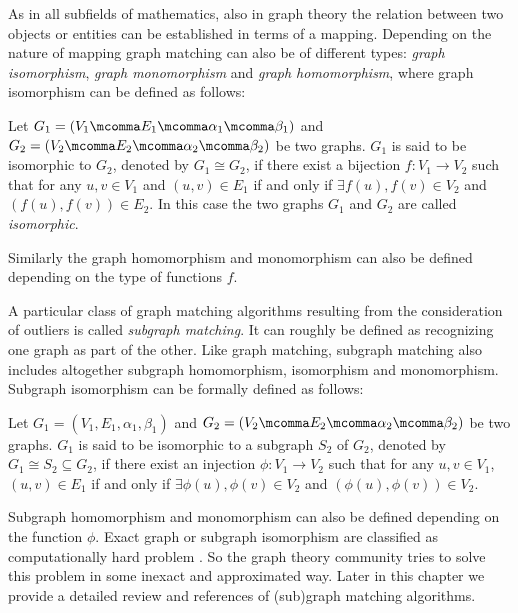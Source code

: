 As in all subfields of mathematics, also in graph theory the relation between two objects or entities can be established in terms of a mapping. Depending on the nature of mapping graph matching can also be of different types: \emph{graph isomorphism}, \emph{graph monomorphism} and \emph{graph homomorphism}, where graph isomorphism can be defined as follows:
\begin{definition}
Let $G_1=(V_1\mcomma E_1\mcomma\alpha_1\mcomma\beta_1)$ and $G_2=(V_2\mcomma E_2\mcomma\alpha_2\mcomma\beta_2)$ be two graphs. $G_1$ is said to be isomorphic to $G_2$, denoted by $G_1\cong G_2$, if there exist a bijection $f:V_1\rightarrow V_2$ such that for any $u,v\in V_1$ and $(u,v)\in E_1$ if and only if $\exists f(u),f(v)\in V_2$ and $(f(u),f(v))\in E_2$. In this case the two graphs $G_1$ and $G_2$ are called \emph{isomorphic}.
\end{definition}
Similarly the graph homomorphism and monomorphism can also be defined depending on the type of functions $f$. 

A particular class of graph matching algorithms resulting from the consideration of outliers is called \emph{subgraph matching}. It can roughly be defined as recognizing one graph as part of the other. Like graph matching, subgraph matching also includes altogether subgraph homomorphism, isomorphism and monomorphism. Subgraph isomorphism can be formally defined as follows:
\begin{definition}
Let $G_1=(V_1,E_1,\alpha_1,\beta_1)$ and $G_2=(V_2\mcomma E_2\mcomma\alpha_2\mcomma\beta_2)$ be two graphs. $G_1$ is said to be isomorphic to a subgraph $S_2$ of $G_2$, denoted by $G_1\cong S_2\subseteq G_2$, if there exist an injection $\phi:V_1\rightarrow V_2$ such that for any $u,v\in V_1$, $(u,v)\in E_1$ if and only if $\exists\phi(u),\phi(v)\in V_2$ and $(\phi(u),\phi(v))\in V_2$.
\end{definition}
Subgraph homomorphism and monomorphism can also be defined depending on the function $\phi$. Exact graph or subgraph isomorphism are classified as computationally hard problem \cite{Mehlhorn1984}. So the graph theory community tries to solve this problem in some inexact and approximated way. Later in this chapter we provide a detailed review and references of (sub)graph matching algorithms.

